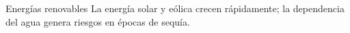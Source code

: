 \documentclass{beamer}
\begin{document}
\begin{frame}{Energías renovables}
La energía solar y eólica crecen rápidamente; la dependencia del agua genera riesgos en épocas de sequía.
\end{frame}
\end{document}
